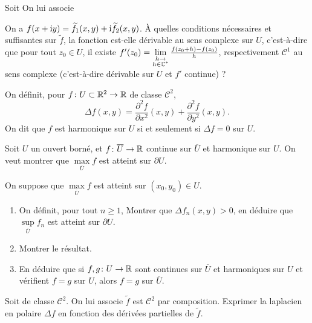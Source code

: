 \documentclass[12pt]{article}
\begin{document}
\begin{exercise}
	Soit 
	On lui associe 

	On a $f(x+\mathrm{i} y)=\widetilde{f}_1(x,y)+\mathrm{i}\widetilde{f}_2(x,y)$.
	À quelles conditions nécessaires et suffisantes sur $\widetilde{f}$, la fonction est-elle dérivable au sens complexe sur $U$, c'est-à-dire que pour tout $z_0\in U$, il existe $f'(z_0)=\lim\limits_{\substack{h\to\\h\in\mathbb{C}^{*}}}\frac{f(z_0+h)-f(z_0)}{h}$, respectivement $\mathcal{C}^{1}$ au sens complexe (c'est-à-dire dérivable sur $U$ et $f'$ continue) ?
\end{exercise}

\begin{exercise}
	On définit, pour $f\colon U\subset\mathbb{R}^{2}\to\mathbb{R}$ de classe $\mathcal{C}^{2}$,
	\begin{equation}
		\Delta f(x,y)=\frac{\partial^{2}f}{\partial x^{2}}(x,y)+\frac{\partial^{2}f}{\partial y^{2}}(x,y).
	\end{equation}
	On dit que $f$ est harmonique sur $U$ si et seulement si $\Delta f=0$ sur $U$.

	Soit $U$ un ouvert borné, et $f\colon\overline{U}\to\mathbb{R}$ continue sur $\overline{U}$ et harmonique sur $U$. On veut montrer que $\max\limits_{\overline{U}}f$ est atteint sur $\partial U$.

	On suppose que $\max\limits_{\overline{U}}f$ est atteint sur $(x_0,y_0)\in U$.
	\begin{enumerate}
		\item On définit, pour tout $n\geqslant1$, 
		Montrer que $\Delta f_n(x,y)>0$, en déduire que $\sup\limits_{\overline{U}}f_n$ est atteint sur $\partial U$.

		\item Montrer le résultat.
		\item En déduire que si $f,g\colon U\to\mathbb{R}$ sont continues sur $\overline{U}$ et harmoniques sur $U$ et vérifient $f=g$ sur $U$, alors $f=g$ sur $\overline{U}$.
	\end{enumerate}
\end{exercise}

\begin{exercise}
	Soit  de classe $\mathcal{C}^{2}$. On lui associe 
	$\widetilde{f}$ est $\mathcal{C}^{2}$ par composition. Exprimer la laplacien en polaire $\Delta f$ en fonction des dérivées partielles de $\widetilde{f}$.
\end{exercise}
\end{document}
